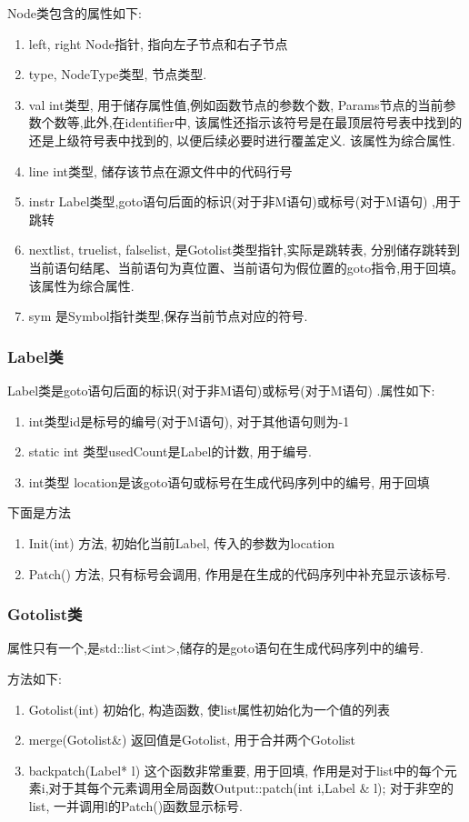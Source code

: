\documentclass[UTF8]{article}
\begin{document}
Node类包含的属性如下:
\begin{enumerate}[(1)]
\item left, right Node指针, 指向左子节点和右子节点
\item type, NodeType类型, 节点类型.
\item val int类型, 用于储存属性值,例如函数节点的参数个数, Params节点的当前参数个数等,此外,在identifier中, 该属性还指示该符号是在最顶层符号表中找到的还是上级符号表中找到的, 以便后续必要时进行覆盖定义. 该属性为综合属性.
\item line int类型, 储存该节点在源文件中的代码行号
\item instr Label类型,goto语句后面的标识(对于非M语句)或标号(对于M语句) ,用于跳转
\item nextlist, truelist, falselist, 是Gotolist类型指针,实际是跳转表, 分别储存跳转到当前语句结尾、当前语句为真位置、当前语句为假位置的goto指令,用于回填。该属性为综合属性.
\item sym 是Symbol指针类型,保存当前节点对应的符号.
\end{enumerate}
\subsubsection{Label类}
Label类是goto语句后面的标识(对于非M语句)或标号(对于M语句) .属性如下:
\begin{enumerate}[(1)]
\item int类型id是标号的编号(对于M语句), 对于其他语句则为-1
\item static int 类型usedCount是Label的计数, 用于编号.
\item int类型 location是该goto语句或标号在生成代码序列中的编号, 用于回填
\end{enumerate}
下面是方法
\begin{enumerate}[(1)]
\item Init(int) 方法, 初始化当前Label, 传入的参数为location
\item Patch() 方法, 只有标号会调用, 作用是在生成的代码序列中补充显示该标号.
\end{enumerate}
\subsubsection{Gotolist类}
属性只有一个,是std::list<int>,储存的是goto语句在生成代码序列中的编号.

方法如下:
\begin{enumerate}
\item Gotolist(int) 初始化, 构造函数, 使list属性初始化为一个值的列表
\item merge(Gotolist\&) 返回值是Gotolist, 用于合并两个Gotolist
\item backpatch(Label* l) 这个函数非常重要, 用于回填, 作用是对于list中的每个元素i,对于其每个元素调用全局函数Output::patch(int i,Label \& l); 对于非空的list, 一并调用l的Patch()函数显示标号.
\end{enumerate}
\end{document}
